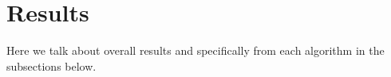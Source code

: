 \section{Results}
Here we talk about overall results and specifically from each algorithm in the
subsections below.